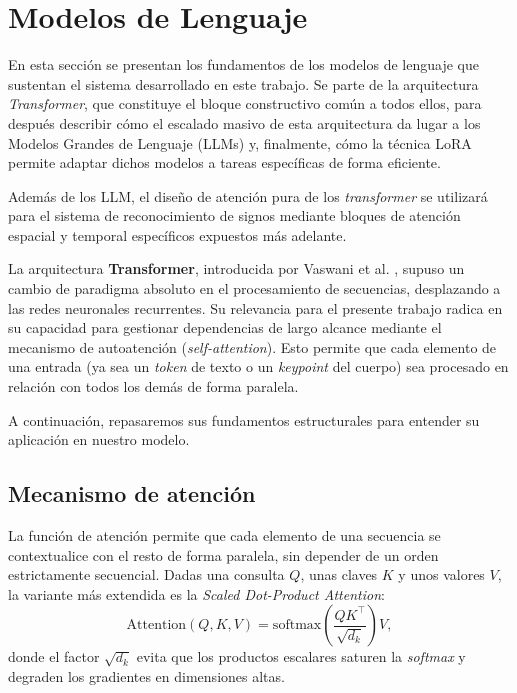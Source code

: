 \section{Modelos de Lenguaje}\label{sub:transformer}

En esta sección se presentan los fundamentos de los modelos de lenguaje que sustentan el sistema desarrollado en este trabajo.
Se parte de la arquitectura \textit{Transformer}, que constituye el bloque constructivo común a todos ellos, para después describir cómo el escalado masivo de esta arquitectura da lugar a los Modelos Grandes de Lenguaje (LLMs) y, finalmente, cómo la técnica LoRA permite adaptar dichos modelos a tareas específicas de forma eficiente.

Además de los LLM, el diseño de atención pura de los \textit{transformer} se utilizará para el sistema de reconocimiento de signos mediante bloques de atención espacial y temporal específicos expuestos más adelante.

La arquitectura \textbf{Transformer}, introducida por Vaswani et al. \cite{vaswani2023attentionneed}, supuso un cambio de paradigma absoluto en el procesamiento de secuencias, desplazando a las redes neuronales recurrentes.
Su relevancia para el presente trabajo radica en su capacidad para gestionar dependencias de largo alcance mediante el mecanismo de autoatención (\textit{self-attention}).
Esto permite que cada elemento de una entrada (ya sea un \textit{token} de texto o un \textit{keypoint} del cuerpo) sea procesado en relación con todos los demás de forma paralela.

A continuación, repasaremos sus fundamentos estructurales para entender su aplicación en nuestro modelo.


\subsection{Mecanismo de atención}\label{sub:attention}

La función de atención permite que cada elemento de una secuencia se contextualice con el resto de forma paralela, sin depender de un orden estrictamente secuencial. Dadas una consulta $Q$, unas claves $K$ y unos valores $V$, la variante más extendida es la \textit{Scaled Dot-Product Attention}:
\begin{equation*}
  \mathrm{Attention}(Q,K,V) = \mathrm{softmax}\!\left(\frac{QK^\top}{\sqrt{d_k}}\right)V,
\end{equation*}
donde el factor $\sqrt{d_k}$ evita que los productos escalares saturen la \textit{softmax} y degraden los gradientes en dimensiones altas.

